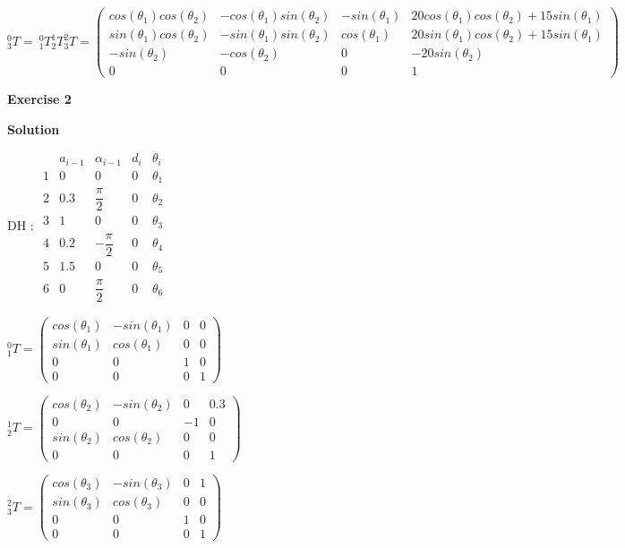 \documentclass[8pt]{article}
\begin{document}
$^0_3T = \ ^0_1T ^1_2T ^2_3T = \left( \begin{array}{cccc}
cos(\theta_1) cos(\theta_2) & -cos(\theta_1) sin(\theta_2) & -sin(\theta_1) & 20cos(\theta_1) cos(\theta_2) + 15 sin(\theta_1) \\
sin(\theta_1) cos(\theta_2) & - sin(\theta_1) sin(\theta_2) & cos(\theta_1) & 20 sin(\theta_1) cos(\theta_2) + 15 sin(\theta_1) \\
-sin(\theta_2) & -cos(\theta_2) & 0 & -20 sin(\theta_2) \\
0 & 0 & 0 & 1
\end{array} \right) $

\textbf{Exercise 2}		
		
\textbf{Solution}

\medskip

\begin{list}{()~}{}
\item
DH :
$ \begin{array}{ccccc}
& a_{i-1} & \alpha_{i-1} & d_i & \theta_i \\
1& 0 & 0 & 0 & \theta_1 \\
2& 0.3 & \dfrac{\pi}{2} & 0 & \theta_2 \\
3& 1 & 0 & 0 & \theta_3 \\
4& 0.2 & - \dfrac{\pi}{2} & 0 & \theta_4 \\
5& 1.5 & 0 & 0 & \theta_5 \\
6& 0 & \dfrac{\pi}{2} & 0 & \theta_6
\end{array} $

$^0_1T = \left( \begin{array}{cccc}
cos(\theta_1) & -sin(\theta_1) & 0 & 0 \\
sin(\theta_1) & cos(\theta_1) & 0 & 0 \\
0 & 0 & 1 & 0 \\
0 & 0 & 0 & 1
\end{array} \right) $

$^1_2T = \left( \begin{array}{cccc}
cos(\theta_2) & -sin(\theta_2) & 0 & 0.3 \\
0 & 0 & -1 & 0 \\
sin(\theta_2) & cos(\theta_2) & 0 & 0 \\
0 & 0 & 0 & 1
\end{array} \right) $

$^2_3T = \left( \begin{array}{cccc}
cos(\theta_3) & -sin(\theta_3) & 0 & 1 \\
sin(\theta_3) & cos(\theta_3) & 0 & 0 \\
0 & 0 & 1 & 0 \\
0 & 0 & 0 & 1
\end{array} \right) $


\end{list}
\end{document}
